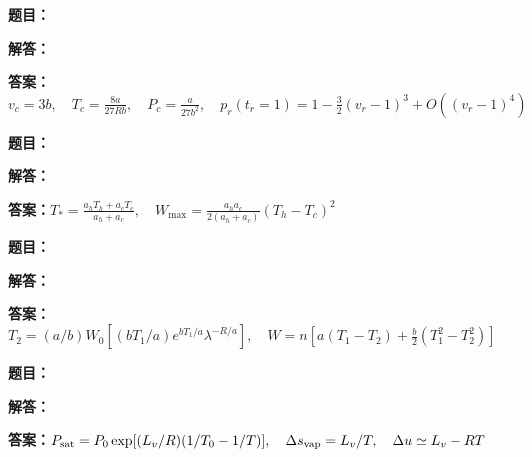 \documentclass[lang=cn,color=blue,11pt]{elegantbook}
\begin{document}
\par
\noindent\textbf{题目：}
\par\noindent\textbf{解答：}
\par\noindent\textbf{答案：}\(\displaystyle v_c=3b,\quad T_c=\frac{8a}{27Rb},\quad P_c=\frac{a}{27b^2},\quad p_r(t_r=1)=1-\frac32(v_r-1)^3+O((v_r-1)^4)\)\par
\par\smallskip\noindent\hrulefill\par\medskip
{}\par
\noindent\textbf{题目：}
\par\noindent\textbf{解答：}
\par\noindent\textbf{答案：}\(\displaystyle T_*=\frac{a_hT_h+a_cT_c}{a_h+a_c},\quad W_{\max}=\frac{a_ha_c}{2(a_h+a_c)}(T_h-T_c)^2\)\par
\par\smallskip\noindent\hrulefill\par\medskip
{}\par
\noindent\textbf{题目：}
\par\noindent\textbf{解答：}
\par\noindent\textbf{答案：}\(\displaystyle T_2=(a/b)W_0[(bT_1/a)e^{bT_1/a}\lambda^{-R/a}],\quad W=n[a(T_1-T_2)+\frac b2(T_1^2-T_2^2)]\)\par
\par\smallskip\noindent\hrulefill\par\medskip
{}\par
\noindent\textbf{题目：}
\par\noindent\textbf{解答：}
\par\noindent\textbf{答案：}\(\displaystyle P_{\rm sat}=P_0\exp[(L_v/R)(1/T_0-1/T)],\quad\Delta s_{\rm vap}=L_v/T,\quad\Delta u\simeq L_v-RT\)\par
\par\smallskip\noindent\hrulefill\par\medskip
\end{document}
